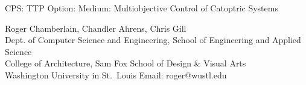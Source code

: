 \documentclass[final,11pt]{article}
\begin{document}
\thispagestyle{empty}
\setcounter{page}{0}

\begin{center}
{\Large CPS: TTP Option: Medium: Multiobjective Control of Catoptric Systems}

\vskip 0.2in
{\sc Roger Chamberlain, Chandler Ahrens, Chris Gill}
\\Dept. of Computer Science and Engineering, School of Engineering and Applied Science\\
College of Architecture, Sam Fox School of Design \& Visual Arts
\\Washington University in St.~Louis
\vskip 0.05in
Email: roger@wustl.edu
\end{center}

\clearpage
\pagestyle{plain}
\setcounter{page}{1}









%

\clearpage

%

\end{document}
